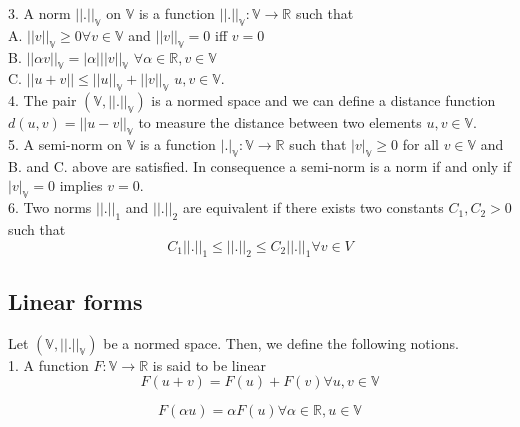 \documentclass[a4paper]{book}
\begin{document}
\begin{appendices}
3. A norm $||.||_\mathbb{V}$ on $\mathbb{V}$ is a function $||.||_\mathbb{V} : \mathbb{V} \rightarrow \mathbb{R}$ such that\\ 

A. $||v||_\mathbb{V} \geq 0 \forall v \in \mathbb{V}$ and $||v||_\mathbb{V} = 0$ iff $v=0$\\
B. $||\alpha v||_\mathbb{V} = |\alpha| ||v||_\mathbb{V}$  $\forall \alpha \in \mathbb{R}, v \in \mathbb{V}$\\
C. $||u+v|| \leq ||u||_\mathbb{V} + ||v||_\mathbb{V}$ $u,v \in \mathbb{V}$.\\

4. The pair $(\mathbb{V},||.||_\mathbb{V})$ is a normed space and we can define a distance function $d(u,v) = ||u-v||_\mathbb{V}$ to measure the distance between two elements $u,v \in \mathbb{V}$.\\

5. A semi-norm on $\mathbb{V}$ is a function $|.|_\mathbb{V} : \mathbb{V} \rightarrow \mathbb{R}$ such that $|v|_\mathbb{V} \geq 0$ for all $v \in \mathbb{V}$ and B. and C. above are satisfied. In consequence a semi-norm is a norm if and only if $|v|_\mathbb{V} = 0$ implies  $v = 0$.\\

6. Two norms $||.||_1$ and $||.||_2$ are equivalent if there exists two constants $C_1,C_2 > 0$ such that \\

\begin{equation} \label{norm_equivalent}
C_1||.||_1 \leq ||.||_2 \leq C_2 ||.||_1 \forall v \in V
\end{equation}

\subsection{Linear forms}

Let $(\mathbb{V,||.||_\mathbb{V}})$ be a normed space. Then, we define the following notions.\\

1. A function $F : \mathbb{V} \rightarrow \mathbb{R}$ is said to be linear
\begin{equation} 
F(u+v) = F(u) + F(v) \forall u,v \in \mathbb{V} 
\end{equation}

\begin{equation} 
F(\alpha u) = \alpha F(u) \forall \alpha \in \mathbb{R}, u \in \mathbb{V}
\end{equation}


\end{appendices}
\end{document}
